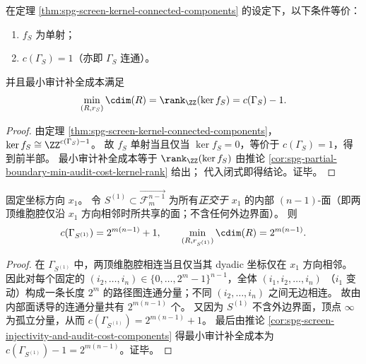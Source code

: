 \begin{corollary}[部分屏幕的唯一回放判据与最小审计补全成本闭式]\label{cor:spg-screen-injectivity-and-audit-cost-components}
在定理 \ref{thm:spg-screen-kernel-connected-components} 的设定下，以下条件等价：
\begin{enumerate}
  \item \(f_S\) 为单射；
  \item \(c(\Gamma_S)=1\)（亦即 \(\Gamma_S\) 连通）。
\end{enumerate}
并且最小审计补全成本满足
\[
\min_{(R,r_S)}\cdim(R)
=\rank_{\ZZ}(\ker f_S)
=c(\Gamma_S)-1.
\]
\end{corollary}
\begin{proof}
由定理 \ref{thm:spg-screen-kernel-connected-components}，
\(
\ker f_S\cong \ZZ^{c(\Gamma_S)-1}
\)。
故 \(f_S\) 单射当且仅当 \(\ker f_S=0\)，等价于 \(c(\Gamma_S)=1\)，得到前半部。
最小审计补全成本等于 \(\rank_{\ZZ}(\ker f_S)\) 由推论 \ref{cor:spg-partial-boundary-min-audit-cost-kernel-rank} 给出；
代入闭式即得结论。证毕。
\end{proof}

\begin{proposition}\label{prop:spg-axial-screen-area-law-audit-cost}
固定坐标方向 \(x_1\)。
令 \(S^{(1)}\subset \overrightarrow{\mathcal F_{m}^{n-1}}\) 为所有\emph{正交于 \(x_1\)} 的内部 \((n-1)\)-面（即两顶维胞腔仅沿 \(x_1\) 方向相邻时所共享的面；不含任何外边界面）。
则
\[
c(\Gamma_{S^{(1)}})=2^{m(n-1)}+1,
\qquad
\min_{(R,r_{S^{(1)}})}\cdim(R)=2^{m(n-1)}.
\]
\end{proposition}
\begin{proof}
在 \(\Gamma_{S^{(1)}}\) 中，两顶维胞腔相连当且仅当其 dyadic 坐标仅在 \(x_1\) 方向相邻。
因此对每个固定的 \((i_2,\dots,i_n)\in\{0,\dots,2^m-1\}^{n-1}\)，全体
\(
(i_1,i_2,\dots,i_n)
\)
（\(i_1\) 变动）构成一条长度 \(2^m\) 的路径图连通分量；不同 \((i_2,\dots,i_n)\) 之间无边相连。
故由内部面诱导的连通分量共有 \(2^{m(n-1)}\) 个。
又因为 \(S^{(1)}\) 不含外边界面，顶点 \(\infty\) 为孤立分量，从而
\(
c(\Gamma_{S^{(1)}})=2^{m(n-1)}+1
\)。
最后由推论 \ref{cor:spg-screen-injectivity-and-audit-cost-components} 得最小审计补全成本为 \(c(\Gamma_{S^{(1)}})-1=2^{m(n-1)}\)。证毕。
\end{proof}

